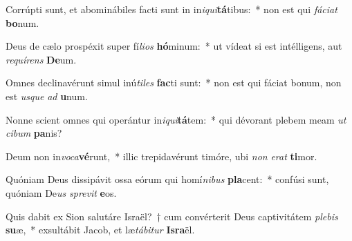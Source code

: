 \item Corrúpti sunt, et abominábiles facti sunt in in\textit{i}\textit{qui}\textbf{tá}tibus:~* non est qui \textit{fá}\textit{ci}\textit{at} \textbf{bo}num.
\item Deus de cælo prospéxit super fí\textit{li}\textit{os} \textbf{hó}minum:~* ut vídeat si est intélligens, aut \textit{re}\textit{quí}\textit{rens} \textbf{De}um.
\item Omnes declinavérunt simul inú\textit{ti}\textit{les} \textbf{fac}ti sunt:~* non est qui fáciat bonum, non est \textit{us}\textit{que} \textit{ad} \textbf{u}num.
\item Nonne scient omnes qui operántur in\textit{i}\textit{qui}\textbf{tá}tem:~* qui dévorant plebem meam \textit{ut} \textit{ci}\textit{bum} \textbf{pa}nis?
\item Deum non in\textit{vo}\textit{ca}\textbf{vé}runt,~* illic trepidavérunt timóre, ubi \textit{non} \textit{e}\textit{rat} \textbf{ti}mor.
\item Quóniam Deus dissipávit ossa eórum qui homí\textit{ni}\textit{bus} \textbf{pla}cent:~* confúsi sunt, quóniam De\textit{us} \textit{spre}\textit{vit} \textbf{e}os.
\item Quis dabit ex Sion salutáre Israël?~† cum convérterit Deus captivitátem \textit{ple}\textit{bis} \textbf{su}æ,~* exsultábit Jacob, et læ\textit{tá}\textit{bi}\textit{tur} \textbf{Is}\textbf{ra}ël.
